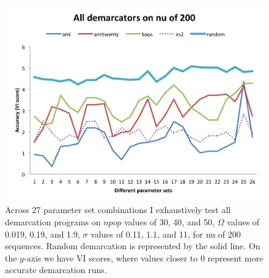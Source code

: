 %

\begin{figure}[h!]
  \centering
    \includegraphics[scale=0.75]{images/ResultGraphs/ResultGraphs-1}
      \caption[All demarcation graphical accuracy visualization on $nu = 200$.]{Across 27 parameter set combinations I exhaustively test all demarcation programs on $npop$ values of 30, 40, and 50, $\Omega$ values of 0.019, 0.19, and 1.9, $\sigma$ values of 0.11, 1.1, and 11, for nu of 200 sequences. Random demarcation is represented by the solid line. On the $y$-axis we have VI scores, where values closer to 0 represent more accurate demarcation runs.}
    \label{fig:All200}
\end{figure}

